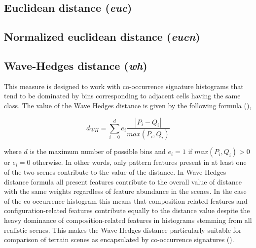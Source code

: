 \subsection{Euclidean distance ({\it euc})}


\subsection{Normalized euclidean distance ({\it eucn})}


\subsection{Wave-Hedges distance ({\it wh})}

This measure is designed to work with co-occurrence signature histograms that tend to be dominated by bins corresponding to adjacent cells having the same class. 
The value of the Wave Hedges distance is given by the following formula (\cite{Cha2007}),

\begingroup
\begin{equation} \label{eq:wave_hedges}
d_{WH}=\sum\limits_{i=0}^{d}{
 e_i\dfrac{ |P_{i} - Q_{i}|}{max(P_{i},Q_{i})}}
\end{equation}
\endgroup

\noindent where $d$ is the maximum number of possible bins and $e_i = 1$ if $max(P_{i},Q_{i})>0$ or $e_i = 0$ otherwise.
In other words, only pattern features present in at least one of the two scenes contribute to the value of the distance. 
In Wave Hedges distance formula all present features contribute to the overall value of distance with the same weights regardless of feature abundance in the scenes. 
In the case of the co-occurrence histogram this means that composition-related features and configuration-related features contribute equally to the distance value despite the heavy dominance of composition-related features in histograms stemming from all realistic scenes. 
This makes the Wave Hedges distance particularly suitable for comparison of terrain scenes as encapsulated by co-occurrence signatures (\cite{Jasiewicz2014GMRH}).


